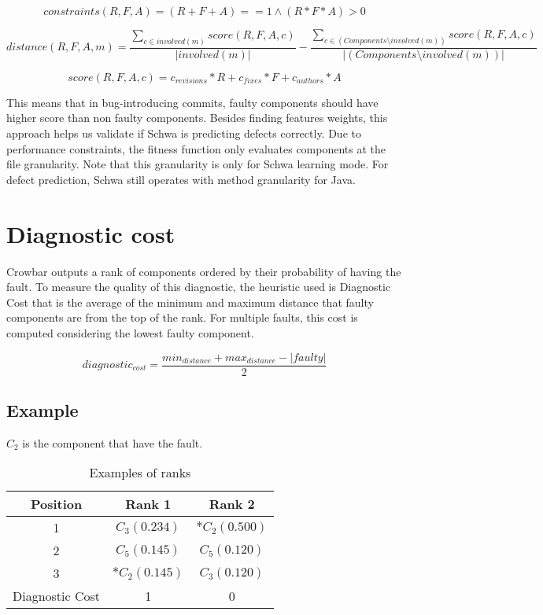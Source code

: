\begin{equation}
constraints(R,F,A) = (R+F+A) == 1 \wedge (R*F*A) > 0
\end{equation}

\begin{equation}
distance(R,F,A,m) = \frac{ \sum_{c \in involved(m)}^{} score(R,F,A,c) }{|involved(m)|} - \frac{ \sum_{c \in (Components \setminus involved(m))}^{} score(R,F,A,c) }{|(Components \setminus involved(m))|}
\end{equation}

\begin{equation}
score(R,F,A,c) = c_{revisions} * R + c_{fixes} * F + c_{authors} * A
\end{equation}

This means that in bug-introducing commits, faulty components should have
higher score than non faulty components. Besides finding features weights,
this approach helps us validate if Schwa is predicting defects correctly. Due
to performance constraints, the fitness function only evaluates components at the
file granularity. Note that this granularity is only for Schwa learning mode. For
defect prediction, Schwa still operates with method granularity for Java.


\section{Diagnostic cost}
Crowbar outputs a rank of components ordered by their probability of having the
fault. To measure the quality of this diagnostic, the heuristic used is Diagnostic
Cost \cite{6693085} that is the average of the minimum and maximum distance that
faulty components are from the top of the rank. For multiple faults, this cost
is computed considering the lowest faulty component.

\begin{equation}
diagnostic_{cost} = \frac{min_{distance} + max_{distance} - |faulty|}{2}
\end{equation}

\subsection{Example}
\( C_2 \) is the component that have the fault.

\begin{table}[h]
\centering
\caption{Examples of ranks}
\label{my-label}
\begin{tabular}{|c|c|c|}
\hline
Position & Rank 1 & Rank 2 \\ \hline
    1    &   \( C_3(0.234) \)   &  \( *C_2(0.500) \)     \\ \hline
    2    &   \( C_5(0.145) \)   &  \( C_5(0.120) \)     \\ \hline
    3    &   \( *C_2(0.145) \)   &  \( C_3(0.120) \)   \\ \hline
    Diagnostic Cost   &   1   &  0  \\ \hline
\end{tabular}
\end{table}

